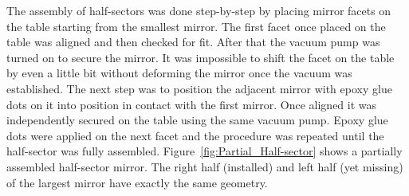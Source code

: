 

The assembly of half-sectors was done step-by-step by placing mirror facets on the table starting from the smallest
mirror. The first facet once placed on the table was aligned and then checked for fit. After that the vacuum pump was
turned on to secure the mirror. It was impossible to shift the facet on the table by even a little bit without deforming
the mirror once the vacuum was established. The next step was to position the adjacent mirror with epoxy glue dots on
it into position in contact with the first mirror. Once aligned it was independently secured on the table using the same
vacuum pump. Epoxy glue dots were applied on the next facet and the procedure was repeated until the half-sector
was fully assembled. Figure~\ref{fig:Partial_Half-sector} shows a partially assembled half-sector mirror. The right
half (installed) and left half (yet missing) of the largest mirror have exactly the same geometry.

